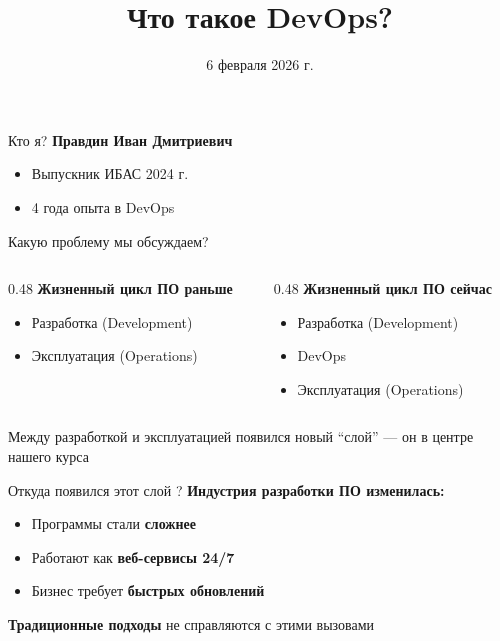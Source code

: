 \documentclass[aspectratio=169]{beamer}
\title{Что такое DevOps?}
\date{6 февраля 2026 г.}
\begin{document}
    \maketitle

    \begin{frame}{Кто я?}
        \textbf{Правдин Иван Дмитриевич}
        \begin{itemize}
            \item Выпускник ИБАС 2024 г.
            \item 4 года опыта в DevOps
        \end{itemize}
    \end{frame}

    \begin{frame}{Какую проблему мы обсуждаем?}
        \begin{columns}[t]

            \begin{column}[t]{0.48\textwidth}
                \textbf{Жизненный цикл ПО раньше}
                \begin{itemize}
                    \item Разработка (Development)
                    \item Эксплуатация (Operations)
                \end{itemize}
            \end{column}

            \begin{column}[t]{0.48\textwidth}
                \textbf{Жизненный цикл ПО сейчас}
                \begin{itemize}
                    \item Разработка (Development)
                    \item DevOps
                    \item Эксплуатация (Operations)
                \end{itemize}
            \end{column}

        \end{columns}

        \vspace{0.8cm}

        Между разработкой и эксплуатацией появился новый \enquote{слой} — он в центре нашего курса
    \end{frame}

    \begin{frame}{Откуда появился этот слой ?}
        \textbf{Индустрия разработки ПО изменилась:}
        \begin{itemize}
        \item Программы стали \textbf{сложнее}
        \item Работают как \textbf{веб-сервисы 24/7}
        \item Бизнес требует \textbf{быстрых обновлений}
        \end{itemize}

        \vspace{0.5cm}

        \textbf{Традиционные подходы} не справляются с этими вызовами
    \end{frame}
\end{document}
